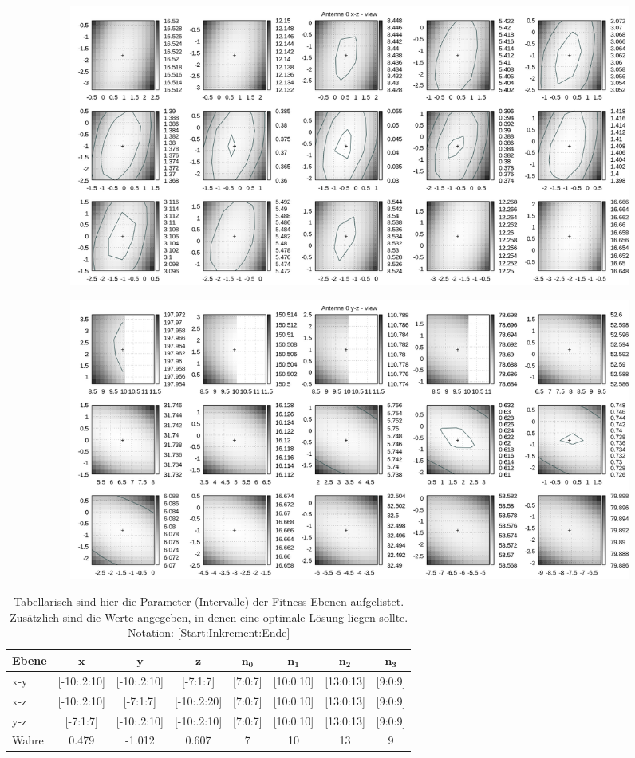 \begin{figure}[!h]
\begin{subfigure}[t]{0.4\textwidth}
			\centering
			\includegraphics[width=\textwidth]{img/fitness/xz_a0zoomed.png}
	 \end{subfigure}
	 \qquad
     \begin{subfigure}[t]{0.4\textwidth}
			\centering
			\includegraphics[width=\textwidth]{img/fitness/yz_a0zoomed.png}
	 \end{subfigure}      
\end{figure}
%
\begin{table} [h]
	\begin{center}
		\caption[Parameter der Fitness Ebenen]{Tabellarisch sind hier die Parameter (Intervalle) der Fitness Ebenen aufgelistet. Zusätzlich sind die Werte angegeben, in denen eine optimale Lösung liegen sollte. Notation: [Start:Inkrement:Ende] }
		\label{tab:complexity1}
		\begin{tabular}{lccccccc}
		\textbf{Ebene} & $\mathbf{x}$ & $\mathbf{y}$ & $\mathbf{z}$ & $\mathbf{n_0}$ & $\mathbf{n_1}$& $\mathbf{n_2}$ & $\mathbf{n_3}$ \\
			\hline
			x-y & [-10:.2:10]		& [-10:.2:10]	& [-7:1:7] & [7:0:7] & [10:0:10]& [13:0:13]&[9:0:9]   \\
			x-z & [-10:.2:10] 	& [-7:1:7] 	& [-10:.2:20] & [7:0:7] & [10:0:10]& [13:0:13]&[9:0:9] \\
			y-z & [-7:1:7]  	& [-10:.2:10]	& [-10:.2:10] & [7:0:7] & [10:0:10]& [13:0:13]&[9:0:9]\\
			\hline
			Wahre & 0.479 & -1.012 & 0.607 & 7  & 10 & 13 & 9			\\
%
		\end{tabular}
	\end{center}
\end{table}